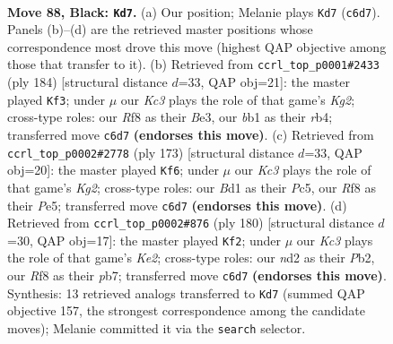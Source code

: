 \documentclass[11pt]{article}
\begin{document}
\clearpage

\begin{figure}[p]\centering
\begin{subfigure}{0.46\textwidth}\centering
\resizebox{\linewidth}{!}{%
\newchessgame
\chessboard[
  setfen={5r2/5p2/n1k3p1/4P2p/5Pp1/8/3N2KP/1B1b4 b - - 35 88},
  showmover=false,
  pgfstyle=straightmove, color=movearrow, markmove={c6-d7}
]}
\caption{}
\end{subfigure}\hfill
\begin{subfigure}{0.46\textwidth}\centering
\resizebox{\linewidth}{!}{%
\newchessgame
\chessboard[
  setfen={8/5kb1/R5p1/5pPp/1r3P1P/4B3/5PK1/8 w - - 49 93},
  showmover=false,
  pgfstyle=straightmove, color=movearrow, markmove={g2-f3}
]}
\caption{}
\end{subfigure}
\\[4pt]
\begin{subfigure}{0.46\textwidth}\centering
\resizebox{\linewidth}{!}{%
\newchessgame
\chessboard[
  setfen={8/6k1/6p1/2p1pp1p/2P1p2P/6P1/5K2/3B4 b - - 57 87},
  showmover=false,
  pgfstyle=straightmove, color=movearrow, markmove={g7-f6}
]}
\caption{}
\end{subfigure}\hfill
\begin{subfigure}{0.46\textwidth}\centering
\resizebox{\linewidth}{!}{%
\newchessgame
\chessboard[
  setfen={8/1p1b4/5pk1/6p1/4P1P1/2B2P2/1P2K3/8 w - - 44 91},
  showmover=false,
  pgfstyle=straightmove, color=movearrow, markmove={e2-f2}
]}
\caption{}
\end{subfigure}
\caption{\textbf{Move 88, Black: \texttt{Kd7}.} (a) Our position; Melanie plays \texttt{Kd7} (\texttt{c6d7}). Panels (b)--(d) are the retrieved master positions whose correspondence most drove this move (highest QAP objective among those that transfer to it). (b) Retrieved from \texttt{ccrl\_top\_p0001\#2433} (ply 184) [structural distance $d$=33, QAP obj=21]: the master played \texttt{Kf3}; under $\mu$ our \emph{Kc3} plays the role of that game's \emph{Kg2}; cross-type roles: our \emph{R}f8 as their \emph{B}e3, our \emph{b}b1 as their \emph{r}b4; transferred move \texttt{c6d7} \textbf{(endorses this move)}. (c) Retrieved from \texttt{ccrl\_top\_p0002\#2778} (ply 173) [structural distance $d$=33, QAP obj=20]: the master played \texttt{Kf6}; under $\mu$ our \emph{Kc3} plays the role of that game's \emph{Kg2}; cross-type roles: our \emph{B}d1 as their \emph{P}c5, our \emph{R}f8 as their \emph{P}e5; transferred move \texttt{c6d7} \textbf{(endorses this move)}. (d) Retrieved from \texttt{ccrl\_top\_p0002\#876} (ply 180) [structural distance $d$=30, QAP obj=17]: the master played \texttt{Kf2}; under $\mu$ our \emph{Kc3} plays the role of that game's \emph{Ke2}; cross-type roles: our \emph{n}d2 as their \emph{P}b2, our \emph{R}f8 as their \emph{p}b7; transferred move \texttt{c6d7} \textbf{(endorses this move)}. Synthesis: 13 retrieved analogs transferred to \texttt{Kd7} (summed QAP objective 157, the strongest correspondence among the candidate moves); Melanie committed it via the \texttt{search} selector.}
\label{fig:thought-m175}
\end{figure}
\end{document}

